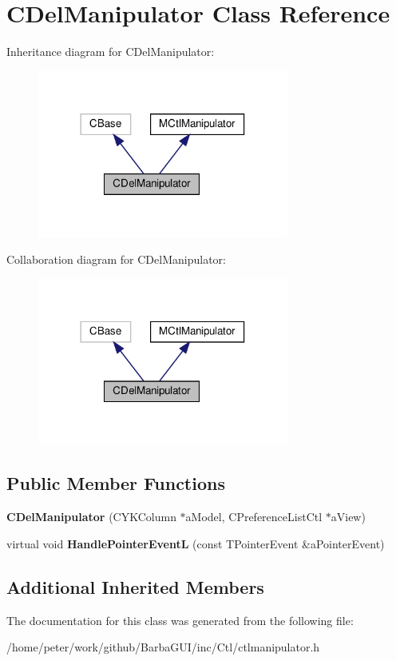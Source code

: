 \hypertarget{classCDelManipulator}{}\section{C\+Del\+Manipulator Class Reference}
\label{classCDelManipulator}


Inheritance diagram for C\+Del\+Manipulator\+:
\nopagebreak
\begin{figure}[H]
\begin{center}
\leavevmode
\includegraphics[width=234pt]{classCDelManipulator__inherit__graph}
\end{center}
\end{figure}


Collaboration diagram for C\+Del\+Manipulator\+:
\nopagebreak
\begin{figure}[H]
\begin{center}
\leavevmode
\includegraphics[width=234pt]{classCDelManipulator__coll__graph}
\end{center}
\end{figure}
\subsection*{Public Member Functions}
\begin{DoxyCompactItemize}
\item 
\mbox{\label{classCDelManipulator_acb37452f6ac4ee3cc7b6d604cfaa02a0}} 
{\bfseries C\+Del\+Manipulator} (C\+Y\+K\+Column $\ast$a\+Model, C\+Preference\+List\+Ctl $\ast$a\+View)
\item 
\mbox{\label{classCDelManipulator_a69993964935447727ff7b048891f758f}} 
virtual void {\bfseries Handle\+Pointer\+EventL} (const T\+Pointer\+Event \&a\+Pointer\+Event)
\end{DoxyCompactItemize}
\subsection*{Additional Inherited Members}


The documentation for this class was generated from the following file\+:\begin{DoxyCompactItemize}
\item 
/home/peter/work/github/\+Barba\+G\+U\+I/inc/\+Ctl/ctlmanipulator.\+h\end{DoxyCompactItemize}
